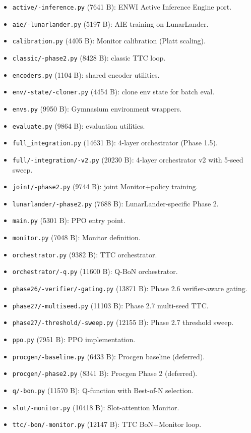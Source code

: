 \documentclass[11pt]{article}
\begin{document}
\begin{itemize}
  \item \texttt{active/-inference.py} (7641 B): ENWI Active Inference Engine port.
  \item \texttt{aie/-lunarlander.py} (5197 B): AIE training on LunarLander.
  \item \texttt{calibration.py} (4405 B): Monitor calibration (Platt scaling).
  \item \texttt{classic/-phase2.py} (8428 B): classic TTC loop.
  \item \texttt{encoders.py} (1104 B): shared encoder utilities.
  \item \texttt{env/-state/-cloner.py} (4454 B): clone env state for batch eval.
  \item \texttt{envs.py} (9950 B): Gymnasium environment wrappers.
  \item \texttt{evaluate.py} (9864 B): evaluation utilities.
  \item \texttt{full\_integration.py} (14631 B): 4-layer orchestrator (Phase 1.5).
  \item \texttt{full/-integration/-v2.py} (20230 B): 4-layer orchestrator v2 with 5-seed sweep.
  \item \texttt{joint/-phase2.py} (9744 B): joint Monitor+policy training.
  \item \texttt{lunarlander/-phase2.py} (7688 B): LunarLander-specific Phase 2.
  \item \texttt{main.py} (5301 B): PPO entry point.
  \item \texttt{monitor.py} (7048 B): Monitor definition.
  \item \texttt{orchestrator.py} (9382 B): TTC orchestrator.
  \item \texttt{orchestrator/-q.py} (11600 B): Q-BoN orchestrator.
  \item \texttt{phase26/-verifier/-gating.py} (13871 B): Phase 2.6 verifier-aware gating.
  \item \texttt{phase27/-multiseed.py} (11103 B): Phase 2.7 multi-seed TTC.
  \item \texttt{phase27/-threshold/-sweep.py} (12155 B): Phase 2.7 threshold sweep.
  \item \texttt{ppo.py} (7951 B): PPO implementation.
  \item \texttt{procgen/-baseline.py} (6433 B): Procgen baseline (deferred).
  \item \texttt{procgen/-phase2.py} (8341 B): Procgen Phase 2 (deferred).
  \item \texttt{q/-bon.py} (11570 B): Q-function with Best-of-N selection.
  \item \texttt{slot/-monitor.py} (10418 B): Slot-attention Monitor.
  \item \texttt{ttc/-bon/-monitor.py} (12147 B): TTC BoN+Monitor loop.
\end{itemize}
\end{document}
